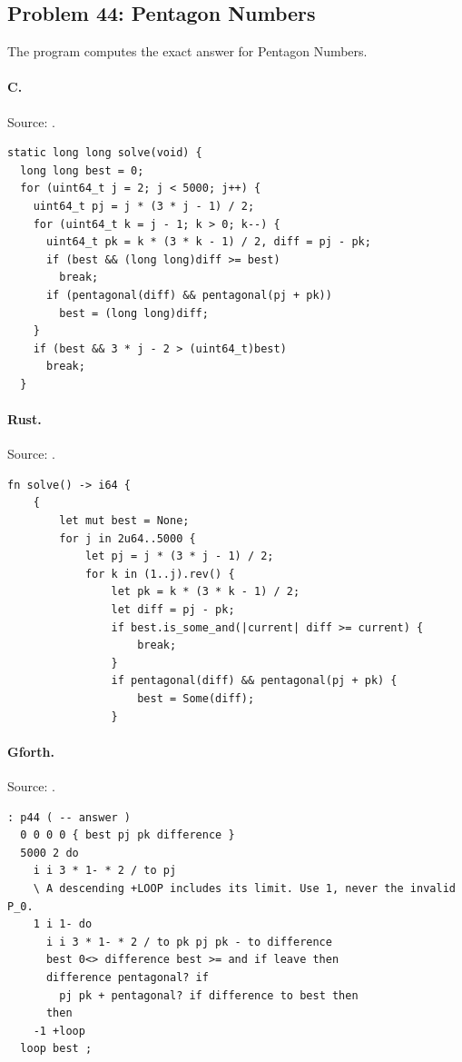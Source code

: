 \subsection{Problem 44: Pentagon Numbers}
\label{walkthrough:p44}
The program computes the exact answer for Pentagon Numbers.

\paragraph{C.} Source: .
\begin{lstlisting}
static long long solve(void) {
  long long best = 0;
  for (uint64_t j = 2; j < 5000; j++) {
    uint64_t pj = j * (3 * j - 1) / 2;
    for (uint64_t k = j - 1; k > 0; k--) {
      uint64_t pk = k * (3 * k - 1) / 2, diff = pj - pk;
      if (best && (long long)diff >= best)
        break;
      if (pentagonal(diff) && pentagonal(pj + pk))
        best = (long long)diff;
    }
    if (best && 3 * j - 2 > (uint64_t)best)
      break;
  }
\end{lstlisting}

\paragraph{Rust.} Source: .
\begin{lstlisting}
fn solve() -> i64 {
    {
        let mut best = None;
        for j in 2u64..5000 {
            let pj = j * (3 * j - 1) / 2;
            for k in (1..j).rev() {
                let pk = k * (3 * k - 1) / 2;
                let diff = pj - pk;
                if best.is_some_and(|current| diff >= current) {
                    break;
                }
                if pentagonal(diff) && pentagonal(pj + pk) {
                    best = Some(diff);
                }
\end{lstlisting}

\paragraph{Gforth.} Source: .
\begin{lstlisting}
: p44 ( -- answer )
  0 0 0 0 { best pj pk difference }
  5000 2 do
    i i 3 * 1- * 2 / to pj
    \ A descending +LOOP includes its limit. Use 1, never the invalid P_0.
    1 i 1- do
      i i 3 * 1- * 2 / to pk pj pk - to difference
      best 0<> difference best >= and if leave then
      difference pentagonal? if
        pj pk + pentagonal? if difference to best then
      then
    -1 +loop
  loop best ;
\end{lstlisting}

